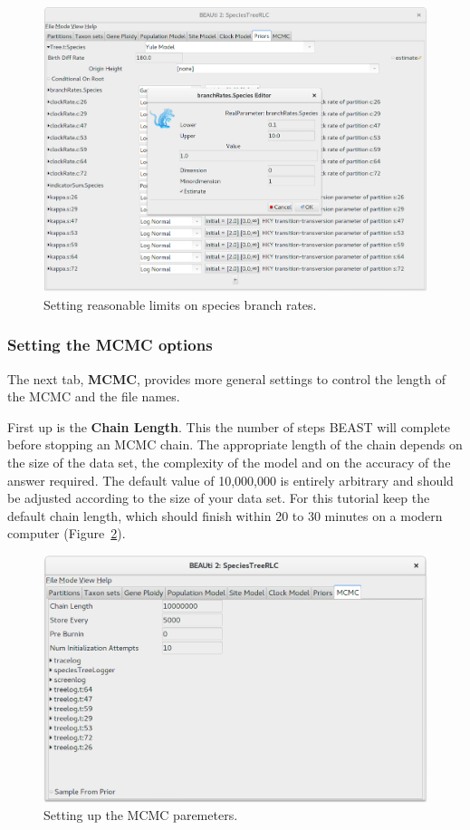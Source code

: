 \documentclass{article}
\begin{document}
\begin{figure}[htb!]
\centering
\includegraphics[width=\textwidth]{figures/beauti-branch-rates.png}
\caption{Setting reasonable limits on species branch rates.}
\label{fig:limits}
\end{figure}

\subsubsection*{Setting the MCMC options }

The next tab, \textbf{MCMC}, provides more general settings to control the
length of the MCMC and the file names.

First up is the \textbf{Chain Length}. This the number of steps BEAST will
complete before stopping an MCMC chain. The appropriate length of the chain
depends on the size of the data set, the complexity of the model and on the
accuracy of the answer required. The default value of 10,000,000 is entirely
arbitrary and should be adjusted according to the size of your data set. For
this tutorial keep the default chain length, which should finish within 20
to 30 minutes on a modern computer (Figure~\ref{fig:mcmc}).

\begin{figure}[htb!]
\centering
\includegraphics[width=\textwidth]{figures/beauti-mcmc.png}
\caption{Setting up the MCMC paremeters.}
\label{fig:mcmc}
\end{figure}
\end{document}
